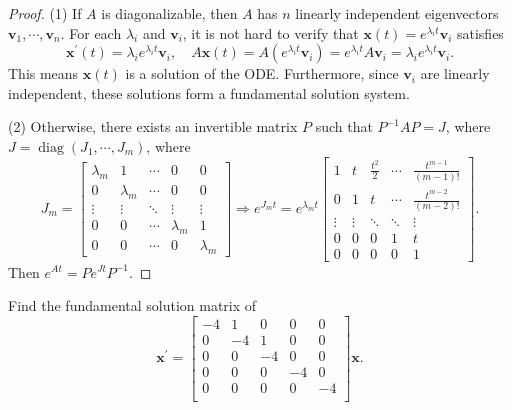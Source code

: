 \begin{proof}
  (1) If $A$ is diagonalizable, then $A$ has $n$ linearly independent eigenvectors
  $\mathbf{v}_1,\cdots,\mathbf{v}_n$. For each $\lambda_i$ and $\mathbf{v}_i$, it is not hard to
  verify that $\mathbf{x}(t) = e^{\lambda_i t}\mathbf{v}_i$ satisfies
  \begin{equation}
    \mathbf{x}^{\prime}(t) = \lambda_i e^{\lambda_i t}\mathbf{v}_i, \quad
    A\mathbf{x}(t) = A (e^{\lambda_i t}\mathbf{v}_i) = e^{\lambda_i t} A\mathbf{v}_i = \lambda_i e^{\lambda_i t}\mathbf{v}_i.
  \end{equation}
  This means $\mathbf{x}(t)$ is a solution of the ODE.
  Furthermore, since $\mathbf{v}_i$ are linearly independent, these solutions form a fundamental solution system.

  (2) Otherwise, there exists an invertible matrix $P$ such that $P^{-1}AP = J$,
  where $J = \operatorname{diag}(J_1,\cdots,J_m)$, where
  \begin{equation}
    J_m =
    \begin{bmatrix}
       \lambda_m & 1 & \cdots & 0 & 0\\
       0 & \lambda_m & \cdots & 0 & 0\\
       \vdots & \vdots & \ddots & \vdots& \vdots\\
       0 &  0& \cdots &\lambda_m & 1\\
       0 &  0& \cdots &0 & \lambda_m
    \end{bmatrix}
    \Rightarrow
    e^{J_m t} = e^{\lambda_m t}
    \begin{bmatrix}
       1 & t & \frac{t^2}{2} & \cdots & \frac{t^{m-1}}{(m-1)!}\\
       0 & 1 & t & \cdots & \frac{t^{m-2}}{(m-2)!}\\
       \vdots & \vdots & \ddots & \ddots & \vdots\\
       0 &  0&  0& 1 & t\\
       0 &  0&  0& 0 & 1
    \end{bmatrix}.
  \end{equation}
  Then $e^{At} = Pe^{J t}P^{-1}$.
\end{proof}

\begin{example}{}{}
  Find the fundamental solution matrix of
  \begin{equation}
    \mathbf{x}^{\prime} =
    \begin{bmatrix}
      -4 & 1 & 0 & 0 & 0\\
      0 & -4 & 1 & 0 & 0\\
      0 & 0 & -4 & 0 & 0\\
      0 & 0 & 0 & -4 & 0\\
      0 & 0 & 0 & 0 & -4\\
    \end{bmatrix} \mathbf{x}.
  \end{equation}
\end{example}

